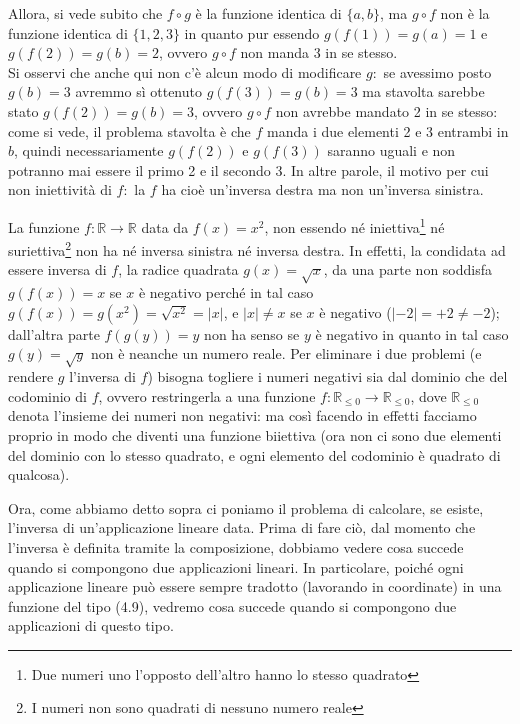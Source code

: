 Allora, si vede subito che $f\circ g$ è la funzione identica di $\{a,b\}$, ma $g\circ f$ non è la funzione
identica di $\{1,2,3\}$ in quanto pur essendo $g(f(1))=g(a)=1$ e $g(f(2))=g(b)=2$, ovvero $g\circ f$ non manda 3
in se stesso.\\
Si osservi che anche qui non c'è alcun modo di modificare $g:$ se avessimo posto $g(b)=3$
avremmo sì ottenuto $g(f(3))=g(b)=3$ ma stavolta sarebbe stato $g(f(2))=g(b)=3$, ovvero
$g \circ f$ non avrebbe mandato 2 in se stesso: come si vede, il problema stavolta è che $f$
manda i due elementi 2 e 3 entrambi in $b$, quindi necessariamente $g(f(2))$ e $g(f(3))$ saranno
uguali e non potranno mai essere il primo 2 e il secondo 3. In altre parole, il motivo per cui
non iniettività di $f:$ la $f$ ha cioè un'inversa destra ma non un'inversa sinistra.
\begin{esempio}
  La funzione $f:\mathbb{R} \to \mathbb{R}$ data da $f(x)=x^2$, non essendo né
  iniettiva\footnote{Due numeri uno l'opposto dell'altro hanno lo stesso quadrato} né
  suriettiva\footnote{I numeri non sono quadrati di nessuno numero reale} non ha né inversa
  sinistra né inversa destra. In effetti, la condidata ad essere inversa di $f$, la radice
  quadrata $g(x)=\sqrt{x}$, da una parte non soddisfa $g(f(x))=x$ se $x$ è negativo perché in
  tal caso $g(f(x))=g(x^2)=\sqrt{x^2}=|x|$, e $|x|\neq x$ se $x$ è negativo ($|-2|=+2\neq -2$);
  dall'altra parte $f(g(y))=y$ non ha senso se $y$ è negativo in quanto in tal caso
  $g(y)=\sqrt{y}$ non è neanche un numero reale. Per eliminare i due problemi (e rendere $g$
  l'inversa di $f$) bisogna togliere i numeri negativi sia dal dominio che del codominio di $f$,
  ovvero restringerla a una funzione $f:\mathbb{R}_{\leq 0} \to \mathbb{R}_{\leq 0}$, dove
  $\mathbb{R}_{\leq 0}$ denota l'insieme dei numeri non negativi: ma così facendo in effetti
  facciamo proprio in modo che diventi una funzione biiettiva (ora non ci sono due elementi del
  dominio con lo stesso quadrato, e ogni elemento del codominio è quadrato di qualcosa).
\end{esempio}
Ora, come abbiamo detto sopra ci poniamo il problema di calcolare, se esiste, l'inversa di
un'applicazione lineare data. Prima di fare ciò, dal momento che l'inversa è definita tramite la
composizione, dobbiamo vedere cosa succede quando si compongono due applicazioni lineari.
In particolare, poiché ogni applicazione lineare può essere sempre tradotto (lavorando in
coordinate) in una funzione del tipo (4.9), vedremo cosa succede quando si compongono due
applicazioni di questo tipo.\\

